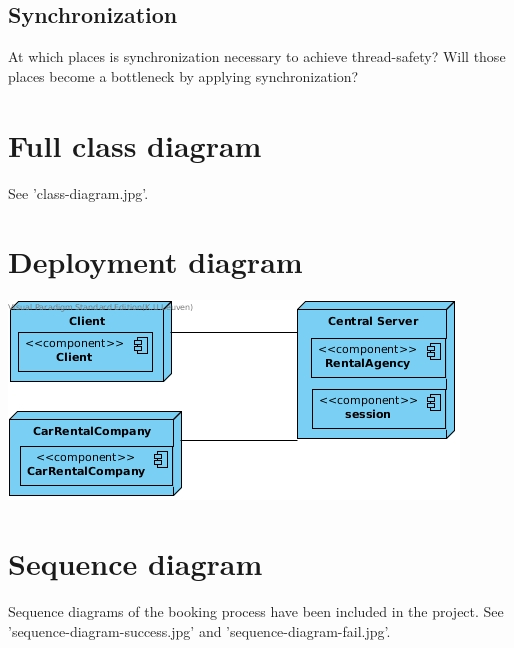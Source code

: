 \documentclass{scrartcl}
\begin{document}
    \subsection{Synchronization}

    At which places is synchronization necessary to achieve thread-safety?
    Will those places become a bottleneck by applying synchronization?

	\section{Full class diagram}
    See 'class-diagram.jpg'.

	\section{Deployment diagram}
    \includegraphics{deployment-diagram.jpg}

    \section{Sequence diagram}
    Sequence diagrams of the booking process have been included in the project.
    See 'sequence-diagram-success.jpg' and 'sequence-diagram-fail.jpg'.

\end{document}

